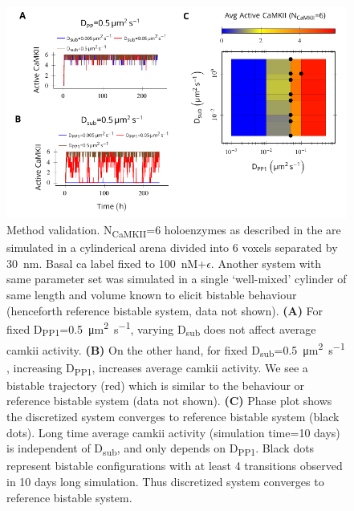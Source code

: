 \documentclass[9pt,lineno,doublespacing]{elife}
\newcommand\SUB[2]{#1\textsubscript{#2}}
\begin{document}
\begin{figure}[ht!]
    \includegraphics[width=12cm]{./PaperFigures/elifeFigure7/figure_su_long_term_effect.pdf}
    \caption{Method validation. \SUB{N}{CaMKII}=6 holoenzymes as described in
        the  are simulated in a cylinderical arena divided
        into 6 voxels separated by \SI{30}{\nano\meter}. Basal \gls{ca} label
        fixed to \SI{100}{\nano M}+$\epsilon$. Another system with same
        parameter set was simulated in a single `well-mixed' cylinder of 
        same length and volume known to elicit bistable
        behaviour (henceforth reference bistable system, data not shown). 
        \textbf{(A)} For fixed \SUB{D}{PP1}=\SI{0.5}{\micro\meter\squared\per\second}, varying
        \SUB{D}{sub} does not affect average \gls{camkii} activity. 
        \textbf{(B)} On the other hand, for fixed
        \SUB{D}{sub}=\SI{0.5}{\micro\meter\squared\per\second} , increasing
        \SUB{D}{PP1}, increases average \gls{camkii} activity. We see a bistable
        trajectory (red) which is similar to the behaviour or reference bistable
        system (data not shown). \textbf{(C)} Phase plot shows the discretized
        system converges to reference bistable system (black dots). Long time
        average \Gls{camkii} activity (simulation time=10 days) is independent of 
        \SUB{D}{sub}, and only depends on \SUB{D}{PP1}. Black dots represent bistable
        configurations with at least 4 transitions observed in 10 days long
        simulation. Thus discretized system converges to reference bistable system.
    }\label{fig:method_validation} 


\end{figure}
\end{document}
